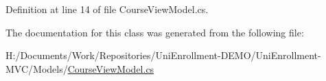 Definition at line 14 of file Course\+View\+Model.\+cs.



The documentation for this class was generated from the following file\+:\begin{DoxyCompactItemize}
\item 
H\+:/\+Documents/\+Work/\+Repositories/\+Uni\+Enrollment-\/\+D\+E\+M\+O/\+Uni\+Enrollment-\/\+M\+V\+C/\+Models/\hyperlink{_course_view_model_8cs}{Course\+View\+Model.\+cs}\end{DoxyCompactItemize}
